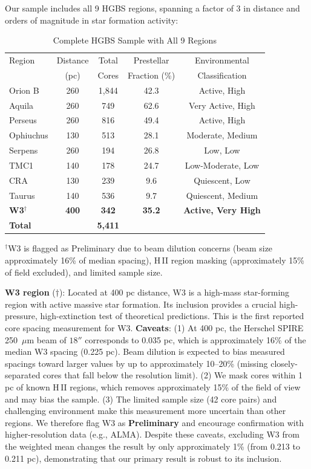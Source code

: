 \documentclass[11pt,a4paper]{article}
\begin{document}
Our sample includes all 9 HGBS regions, spanning a factor of 3 in distance and orders of magnitude in star formation activity:

\begin{table}[H]
\centering
\caption{Complete HGBS Sample with All 9 Regions}
\label{tab:sample_overview}
\begin{tabular}{lcccc}
\toprule
Region & Distance & Total & Prestellar & Environmental \\
       & (pc)   & Cores & Fraction (\%) & Classification \\
\midrule
Orion B  & 260     & 1,844 & 42.3     & Active, High \\
Aquila   & 260     & 749   & 62.6     & Very Active, High \\
Perseus  & 260     & 816   & 49.4     & Active, High \\
Ophiuchus& 130     & 513   & 28.1     & Moderate, Medium \\
Serpens  & 260     & 194   & 26.8     & Low, Low \\
TMC1     & 140     & 178   & 24.7     & Low-Moderate, Low \\
CRA      & 130     & 239   & 9.6      & Quiescent, Low \\
Taurus   & 140     & 536   & 9.7      & Quiescent, Medium \\
\textbf{W3}$^{\dagger}$      & \textbf{400}     & \textbf{342}   & \textbf{35.2}     & \textbf{Active, Very High} \\
\midrule
\textbf{Total} &        & \textbf{5,411} &        &  \\
\bottomrule
\end{tabular}
\vspace{-0.5em}
\small{$^{\dagger}$W3 is flagged as Preliminary due to beam dilution concerns (beam size approximately 16\% of median spacing), H\,{\scriptsize II} region masking (approximately 15\% of field excluded), and limited sample size.}
\end{table}

\noindent\textbf{W3 region} ($\dagger$): Located at 400 pc distance, W3 is a high-mass star-forming region with active massive star formation. Its inclusion provides a crucial high-pressure, high-extinction test of theoretical predictions. This is the first reported core spacing measurement for W3. \textbf{Caveats}: (1) At 400 pc, the Herschel SPIRE 250~$\mu$m beam of $18''$ corresponds to 0.035 pc, which is approximately 16\% of the median W3 spacing (0.225 pc). Beam dilution is expected to bias measured spacings toward larger values by up to approximately 10--20\% (missing closely-separated cores that fall below the resolution limit). (2) We mask cores within 1 pc of known H\,{\scriptsize II} regions, which removes approximately 15\% of the field of view and may bias the sample. (3) The limited sample size (42 core pairs) and challenging environment make this measurement more uncertain than other regions. We therefore flag W3 as \textbf{Preliminary} and encourage confirmation with higher-resolution data (e.g., ALMA). Despite these caveats, excluding W3 from the weighted mean changes the result by only approximately 1\% (from 0.213 to 0.211 pc), demonstrating that our primary result is robust to its inclusion.
\end{document}
